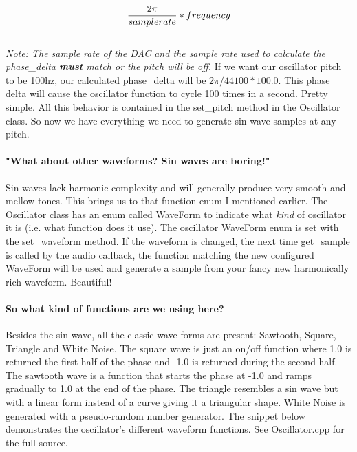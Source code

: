 \documentclass[acmlarge,screen]{acmart}
\begin{document}
	\begin{equation}
		\large
	 	\frac{2\pi}{samplerate} * frequency
		\label{eq:pitch}
	\end{equation}\\

	
	\textit{Note: The sample rate of the DAC and the sample rate used to calculate the phase\_delta \textbf{must} match or the pitch will be off.} If we want our oscillator pitch to be 100hz, our calculated phase\_delta will be \( 2\pi/44100 * 100.0\). This phase delta will cause the oscillator function to cycle 100 times in a second. Pretty simple. All this behavior is contained in the set\_pitch method in the Oscillator class. So now we have everything we need to generate sin wave samples at any pitch.
	
	\paragraph{"What about other waveforms? Sin waves are boring!"} Sin waves lack harmonic complexity and will generally produce very smooth and mellow tones. This brings us to that function enum I mentioned earlier. The Oscillator class has an enum called WaveForm to indicate what \textit{kind} of oscillator it is (i.e. what function does it use). The oscillator WaveForm enum is set with the set\_waveform method. If the waveform is changed, the next time get\_sample is called by the audio callback, the function matching the new configured WaveForm will be used and generate a sample from your fancy new harmonically rich waveform. \cite{downey_2016} Beautiful! 
	
	\paragraph{So what kind of functions are we using here?} Besides the sin wave, all the classic wave forms are present: Sawtooth, Square, Triangle and White Noise. The square wave is just an on/off function where 1.0 is returned the first half of the phase and -1.0 is returned during the second half. The sawtooth wave is a function that starts the phase at -1.0 and ramps gradually to 1.0 at the end of the phase. The triangle resembles a sin wave but with a linear form instead of a curve giving it a triangular shape. White Noise is generated with a pseudo-random number generator. \cite{tagi_2019} The snippet below demonstrates the oscillator's different waveform functions. See Oscillator.cpp for the full source.
	
\end{document}
